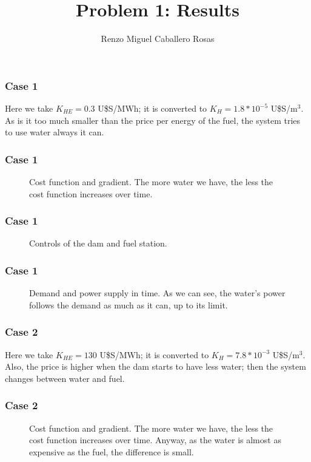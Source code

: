 \documentclass[aspectratio=169]{beamer}\usepackage[utf8]{inputenc}
\title{Problem 1: Results}
\subtitle{Renzo Miguel Caballero Rosas}
\begin{document}
\begin{frame}
\titlepage
\end{frame}

\begin{frame}\frametitle{Case 1}
Here we take $K_{HE}=0.3$ U\$S/MWh; it is converted to $K_H=1.8*10^{-5}$ U\$S/m$^3$. As is it too much smaller than the price per energy of the fuel, the system tries to use water always it can.
\end{frame}

\begin{frame}\frametitle{Case 1}
\begin{figure}[ht!]
\centering
{}
\caption{Cost function and gradient. The more water we have, the less the cost function increases over time.}
\end{figure}
\end{frame}

\begin{frame}\frametitle{Case 1}
\begin{figure}[ht!]
\centering
{}
\caption{Controls of the dam and fuel station.}
\end{figure}
\end{frame}

\begin{frame}\frametitle{Case 1}
\begin{figure}[ht!]
\centering
{}
\caption{Demand and power supply in time. As we can see, the water's power follows the demand as much as it can, up to its limit.}
\end{figure}
\end{frame}

\begin{frame}\frametitle{Case 2}
Here we take $K_{HE}=130$ U\$S/MWh; it is converted to $K_H=7.8*10^{-3}$ U\$S/m$^3$. Also, the price is higher when the dam starts to have less water; then the system changes between water and fuel.\end{frame}

\begin{frame}\frametitle{Case 2}
\begin{figure}[ht!]
\centering
{}
\caption{Cost function and gradient. The more water we have, the less the cost function increases over time. Anyway, as the water is almost as expensive as the fuel, the difference is small.}
\end{figure}
\end{frame}
\end{document}
